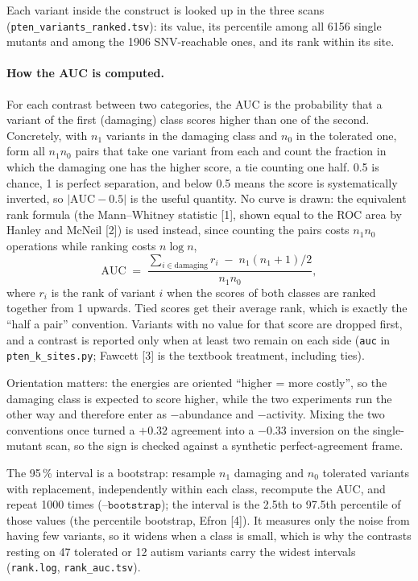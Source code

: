\documentclass[11pt,a4paper]{article}
\newcommand{\file}[1]{\texttt{#1}}
\begin{document}
Each variant inside the construct is looked up in the three scans
(\file{pten\_variants\_ranked.tsv}): its value, its percentile among all 6156
single mutants and among the 1906 SNV-reachable ones, and its rank within its
site.

\paragraph{How the AUC is computed.} For each contrast between two
categories, the AUC is the probability that a variant of the first (damaging)
class scores higher than one of the second. Concretely, with $n_1$ variants in
the damaging class and $n_0$ in the tolerated one, form all $n_1 n_0$ pairs
that take one variant from each and count the fraction in which the damaging
one has the higher score, a tie counting one half. 0.5 is chance, 1 is perfect
separation, and below 0.5 means the score is systematically inverted, so
$|\mathrm{AUC}-0.5|$ is the useful quantity. No curve is drawn: the equivalent
rank formula (the Mann--Whitney statistic [1], shown equal to the ROC area by
Hanley and McNeil [2]) is used instead, since counting the pairs costs
$n_1 n_0$ operations while ranking costs $n\log n$,
\[
  \mathrm{AUC} \;=\;
  \frac{\sum_{i \in \text{damaging}} r_i \;-\; n_1(n_1+1)/2}{n_1 n_0},
\]
where $r_i$ is the rank of variant $i$ when the scores of both classes are
ranked together from 1 upwards. Tied scores get their average rank, which is
exactly the ``half a pair'' convention. Variants with no value for that score
are dropped first, and a contrast is reported only when at least two remain on
each side (\texttt{auc} in \file{pten\_k\_sites.py}; Fawcett [3] is the
textbook treatment, including ties).

Orientation matters: the energies are oriented ``higher = more costly'', so
the damaging class is expected to score higher, while the two experiments run
the other way and therefore enter as $-$abundance and $-$activity. Mixing the
two conventions once turned a $+0.32$ agreement into a $-0.33$ inversion on
the single-mutant scan, so the sign is checked against a synthetic
perfect-agreement frame.

The 95\,\% interval is a bootstrap: resample $n_1$ damaging and $n_0$
tolerated variants with replacement, independently within each class,
recompute the AUC, and repeat 1000 times ($\texttt{--bootstrap}$); the
interval is the 2.5th to 97.5th percentile of those values (the percentile
bootstrap, Efron [4]). It measures only
the noise from having few variants, so it widens when a class is small, which
is why the contrasts resting on 47 tolerated or 12 autism variants carry the
widest intervals (\file{rank.log}, \file{rank\_auc.tsv}).
\end{document}
